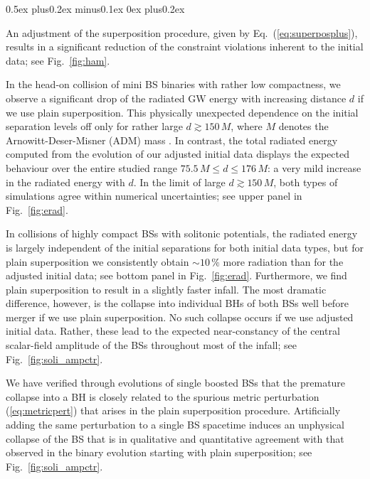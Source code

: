 \documentclass[]{iopart}
\begin{document}
\begin{list}{\rm{\bf ()}}{
                
             \parsep0.5ex plus0.2ex minus0.1ex \itemsep0ex plus0.2ex}
  \item An adjustment of the superposition procedure, given 
  by Eq.~(\ref{eq:superposplus}), results in a significant
  reduction of the constraint violations inherent to the initial data;
  see Fig.~\ref{fig:ham}.
  \item In the head-on collision of mini BS binaries with rather low compactness,
  we observe a significant drop of the radiated GW energy with increasing
  distance $d$ if we use plain superposition. This physically unexpected dependence
  on the initial separation levels off only for rather large 
  $d\gtrsim 150\,M$,
  where $M$ denotes the Arnowitt-Deser-Misner (ADM) mass
  \cite{Arnowitt:1962hi}. In contrast, the total radiated energy computed from
  the evolution of our adjusted initial data displays the expected
  behaviour over the entire studied range $75.5\,M\le d\le 176\,M$:
  a very mild increase in the radiated energy with $d$. In the limit of large
  $d \gtrsim 150\,M$, both types of simulations agree within numerical uncertainties;
  see upper panel in Fig.~\ref{fig:erad}.
  \item In collisions of highly compact BSs with solitonic potentials,
  the radiated energy is largely independent of the initial separations
  for both initial data types, but for plain superposition we consistently
  obtain $\sim 10\,\%$ more radiation than for the adjusted initial data;
  see bottom panel in Fig.~\ref{fig:erad}. Furthermore,
  we find plain superposition to result in a slightly faster infall.
  The most dramatic difference, however, is the collapse into individual BHs
  of both BSs well before merger if we use plain superposition. No such collapse
  occurs if we use adjusted initial data. Rather,
  these lead to the expected near-constancy of the central scalar-field amplitude
  of the BSs throughout most of the infall; see Fig.~\ref{fig:soli_ampctr}.
  \item We have verified through evolutions of single boosted BSs that the
  premature collapse into a BH is closely related to the spurious metric
  perturbation (\ref{eq:metricpert}) that arises in the plain superposition
  procedure. Artificially adding the same perturbation to a single BS
  spacetime induces an unphysical collapse of the BS that is in
  qualitative and quantitative agreement with that observed in
  the binary evolution starting with plain superposition;
  see Fig.~\ref{fig:soli_ampctr}.
\end{list}
%
\end{document}
